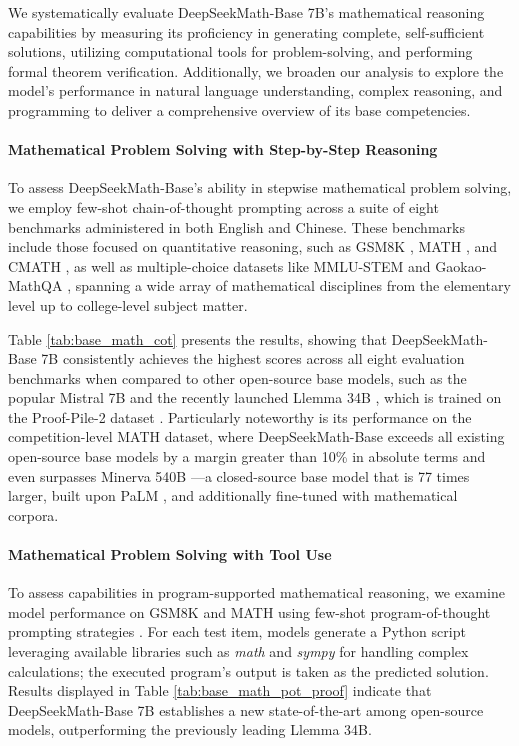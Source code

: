 We systematically evaluate DeepSeekMath-Base 7B's mathematical reasoning capabilities by measuring its proficiency in generating complete, self-sufficient solutions, utilizing computational tools for problem-solving, and performing formal theorem verification. Additionally, we broaden our analysis to explore the model's performance in natural language understanding, complex reasoning, and programming to deliver a comprehensive overview of its base competencies.

\paragraph{Mathematical Problem Solving with Step-by-Step Reasoning}

To assess DeepSeekMath-Base's ability in stepwise mathematical problem solving, we employ few-shot chain-of-thought prompting \citep{cot} across a suite of eight benchmarks administered in both English and Chinese. These benchmarks include those focused on quantitative reasoning, such as GSM8K \citep{gsm8k}, MATH \citep{MATH}, and CMATH \citep{wei2023cmath}, as well as multiple-choice datasets like MMLU-STEM \citep{mmlu} and Gaokao-MathQA \citep{agieval}, spanning a wide array of mathematical disciplines from the elementary level up to college-level subject matter.

Table \ref{tab:base_math_cot} presents the results, showing that DeepSeekMath-Base 7B consistently achieves the highest scores across all eight evaluation benchmarks when compared to other open-source base models, such as the popular Mistral 7B \citep{mistral} and the recently launched Llemma 34B \citep{llemma}, which is trained on the Proof-Pile-2 dataset \citep{llemma}. Particularly noteworthy is its performance on the competition-level MATH dataset, where DeepSeekMath-Base exceeds all existing open-source base models by a margin greater than 10\% in absolute terms and even surpasses Minerva 540B \citep{minerva}—a closed-source base model that is 77 times larger, built upon PaLM \citep{palm}, and additionally fine-tuned with mathematical corpora.

\paragraph{Mathematical Problem Solving with Tool Use}

To assess capabilities in program-supported mathematical reasoning, we examine model performance on GSM8K and MATH using few-shot program-of-thought prompting strategies \citep{pot,pal}. For each test item, models generate a Python script leveraging available libraries such as \textit{math} and \textit{sympy} for handling complex calculations; the executed program's output is taken as the predicted solution. Results displayed in Table \ref{tab:base_math_pot_proof} indicate that DeepSeekMath-Base 7B establishes a new state-of-the-art among open-source models, outperforming the previously leading Llemma 34B.

